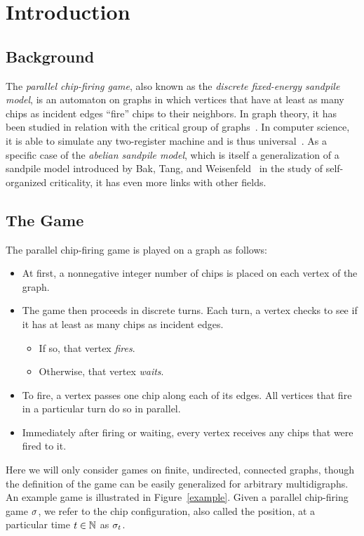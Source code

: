 \section{Introduction}

\subsection*{Background}
The \emph{parallel chip-firing game}, also known as the \emph{discrete
  fixed-energy sandpile model}, is an automaton on graphs in which vertices
that have at least as many chips as incident edges ``fire'' chips to their
neighbors. In graph theory, it has been studied in relation with the critical
group of graphs~\cite{biggs}. In computer science, it is able to simulate any
two-register machine and is thus universal~\cite{universality}. As a specific
case of the \emph{abelian sandpile model}, which is itself a generalization of
a sandpile model introduced by Bak, Tang, and Weisenfeld~\cite{BTWcriticality,
  BTWmoreCriticality} in the study of self-organized criticality, it has even
more links with other fields.

\subsection*{The Game}
The parallel chip-firing game is played on a graph as follows:
\begin{itemize}
\item At first, a nonnegative integer number of chips is placed on each vertex
  of the graph.
\item The game then proceeds in discrete turns. Each turn, a vertex checks to
  see if it has at least as many chips as incident edges.
\begin{itemize}
\item If so, that vertex \emph{fires}.
\item Otherwise, that vertex \emph{waits}.
\end{itemize}
\item To fire, a vertex passes one chip along each of its edges. All vertices
  that fire in a particular turn do so in parallel.
\item Immediately after firing or waiting, every vertex receives any chips that
  were fired to it.
\end{itemize}
Here we will only consider games on finite, undirected, connected graphs,
though the definition of the game can be easily generalized for arbitrary
multidigraphs. An example game is illustrated in Figure~\ref{example}. Given a
parallel chip-firing game $\sigma$, we refer to the chip configuration, also called
the position, at a particular time $t \in \mathbb{N}$ as $\sigma_{t}$.

